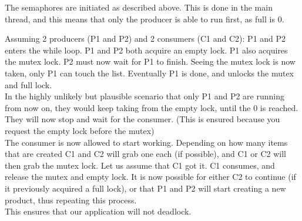 The semaphores are initiated as described above. This is done in the main thread, and this means that only the producer is able to run first, as full is 0.

Assuming 2 producers (P1 and P2) and 2 consumers (C1 and C2):
P1 and P2 enters the while loop. P1 and P2 both acquire an empty lock. P1 also acquires the mutex lock. P2 must now wait for P1 to finish.
Seeing the mutex lock is now taken, only P1 can touch the list. Eventually P1 is done, and unlocks the mutex and full lock. \\

In the highly unlikely but plausible scenario that only P1 and P2 are running from now on, they would keep taking from the empty lock, until the 0 is reached. They will now stop and wait for the consumer. (This is ensured because you request the empty lock before the mutex)\\

The consumer is now allowed to start working. Depending on how many items that are created C1 and C2 will grab one each (if possible), and C1 or C2 will then grab the mutex lock. Let us assume that C1 got it.
C1 consumes, and release the mutex and empty lock. 
It is now possible for either C2 to continue (if it previously acquired a full lock), or that P1 and P2 will start creating a new product, thus repeating this process. \\

This ensures that our application will not deadlock.